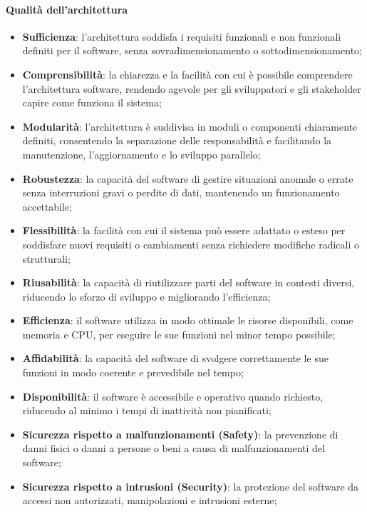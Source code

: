 \paragraph{Qualità dell'architettura}
\begin{itemize}
    \item \textbf{Sufficienza}: l'architettura soddisfa i requisiti funzionali e non funzionali definiti per il software, senza sovradimensionamento o sottodimensionamento;
    \item \textbf{Comprensibilità}: la chiarezza e la facilità con cui è possibile comprendere l'architettura software, rendendo agevole per gli sviluppatori e gli stakeholder capire come funziona il sistema;
    \item \textbf{Modularità}: l'architettura è suddivisa in moduli o componenti chiaramente definiti, consentendo la separazione delle responsabilità e facilitando la manutenzione, l'aggiornamento e lo sviluppo parallelo;
    \item \textbf{Robustezza}: la capacità del software di gestire situazioni anomale o errate senza interruzioni gravi o perdite di dati, mantenendo un funzionamento accettabile;
    \item \textbf{Flessibilità}: la facilità con cui il sistema può essere adattato o esteso per soddisfare nuovi requisiti o cambiamenti senza richiedere modifiche radicali o strutturali;
    \item \textbf{Riusabilità}: la capacità di riutilizzare parti del software in contesti diversi, riducendo lo sforzo di sviluppo e migliorando l'efficienza;
    \item \textbf{Efficienza}: il software utilizza in modo ottimale le risorse disponibili, come memoria e CPU, per eseguire le sue funzioni nel minor tempo possibile;
    \item \textbf{Affidabilità}: la capacità del software di svolgere correttamente le sue funzioni in modo coerente e prevedibile nel tempo;
    \item \textbf{Disponibilità}: il software è accessibile e operativo quando richiesto, riducendo al minimo i tempi di inattività non pianificati;
    \item \textbf{Sicurezza rispetto a malfunzionamenti (Safety)}: la prevenzione di danni fisici o danni a persone o beni a causa di malfunzionamenti del software;
    \item \textbf{Sicurezza rispetto a intrusioni (Security)}: la protezione del software da accessi non autorizzati, manipolazioni e intrusioni esterne;

\end{itemize}
